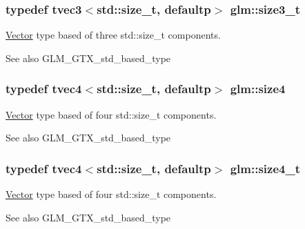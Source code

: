 \subsubsection[{size3\+\_\+t}]{\setlength{\rightskip}{0pt plus 5cm}typedef tvec3$<$std\+::size\+\_\+t, defaultp$>$ {\bf glm\+::size3\+\_\+t}}\label{group__gtx__std__based__type_ga689991bc66c16637f043ade5cbb87260}
\hyperlink{class_vector}{Vector} type based of three std\+::size\+\_\+t components. \begin{DoxySeeAlso}{See also}
G\+L\+M\+\_\+\+G\+T\+X\+\_\+std\+\_\+based\+\_\+type 
\end{DoxySeeAlso}
\hypertarget{group__gtx__std__based__type_ga66a39603f01a37444de3adb28c021e79}{}
\subsubsection[{size4}]{\setlength{\rightskip}{0pt plus 5cm}typedef tvec4$<$std\+::size\+\_\+t, defaultp$>$ {\bf glm\+::size4}}\label{group__gtx__std__based__type_ga66a39603f01a37444de3adb28c021e79}
\hyperlink{class_vector}{Vector} type based of four std\+::size\+\_\+t components. \begin{DoxySeeAlso}{See also}
G\+L\+M\+\_\+\+G\+T\+X\+\_\+std\+\_\+based\+\_\+type 
\end{DoxySeeAlso}
\hypertarget{group__gtx__std__based__type_gaa4f69cfac1c3e014a50fd090974092ec}{}
\subsubsection[{size4\+\_\+t}]{\setlength{\rightskip}{0pt plus 5cm}typedef tvec4$<$std\+::size\+\_\+t, defaultp$>$ {\bf glm\+::size4\+\_\+t}}\label{group__gtx__std__based__type_gaa4f69cfac1c3e014a50fd090974092ec}
\hyperlink{class_vector}{Vector} type based of four std\+::size\+\_\+t components. \begin{DoxySeeAlso}{See also}
G\+L\+M\+\_\+\+G\+T\+X\+\_\+std\+\_\+based\+\_\+type 
\end{DoxySeeAlso}
